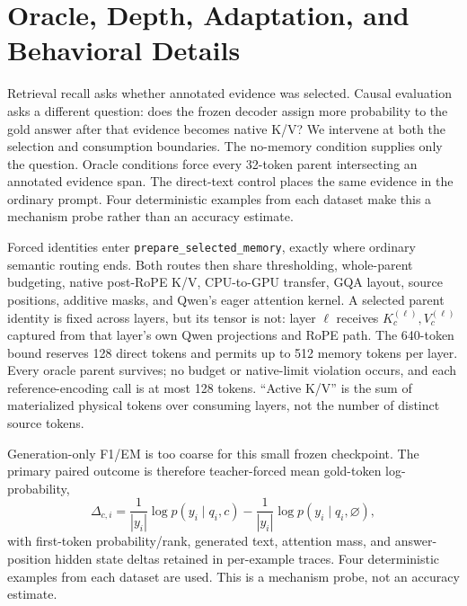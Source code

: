 \documentclass[11pt]{article}
\begin{document}
\section{Oracle, Depth, Adaptation, and Behavioral Details}
\label{app:oracle-depth-details}
\label{sec:oracle-memory-use}

Retrieval recall asks whether annotated evidence was selected. Causal evaluation asks a different
question: does the frozen decoder assign more probability to the gold answer after that evidence
becomes native K/V? We intervene at both the selection and consumption boundaries. The no-memory
condition supplies only the question. Oracle conditions force every 32-token parent intersecting
an annotated evidence span. The direct-text control places the same evidence in the ordinary
prompt. Four deterministic examples from each dataset make this a mechanism probe rather than an
accuracy estimate.

Forced identities enter \texttt{prepare\_selected\_memory}, exactly where ordinary semantic
routing ends. Both routes then share thresholding, whole-parent budgeting, native post-RoPE K/V,
CPU-to-GPU transfer, GQA layout, source positions, additive masks, and Qwen's eager attention
kernel. A selected parent identity is fixed across layers, but its tensor is not: layer $\ell$
receives $K_c^{(\ell)},V_c^{(\ell)}$ captured from that layer's own Qwen projections and RoPE
path. The 640-token bound reserves 128 direct tokens and permits up to 512 memory tokens per
layer. Every oracle parent survives; no budget or native-limit violation occurs, and each
reference-encoding call is at most 128 tokens. ``Active K/V'' is the sum of materialized physical
tokens over consuming layers, not the number of distinct source tokens.

Generation-only F1/EM is too coarse for this small frozen checkpoint. The primary paired outcome
is therefore teacher-forced mean gold-token log-probability,
\begin{equation}
\Delta_{c,i}=\frac{1}{|y_i|}\log p(y_i\mid q_i,c)-
              \frac{1}{|y_i|}\log p(y_i\mid q_i,\varnothing),
\end{equation}
with first-token probability/rank, generated text, attention mass, and answer-position hidden
state deltas retained in per-example traces. Four deterministic examples from each dataset are
used. This is a mechanism probe, not an accuracy estimate.
\end{document}
